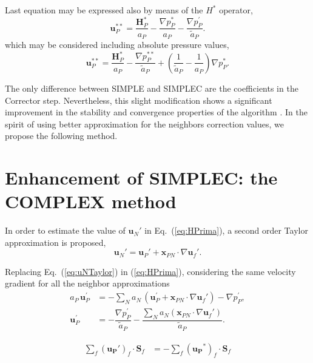 \documentclass[final,3p,times,10pt,onecolumn]{myElsarticle}
\numberwithin{equation}{section}
\begin{document}
Last equation may be expressed also by means of the $H^*$ operator,
\begin{equation}
\boldsymbol{u}^{**}_P 
=
\dfrac
{\boldsymbol{H}_P^* }
{a_P}
- 
\frac{\nabla p_P^{*}}{a_P}
- 
\frac{\nabla p_P^{'}}{\tilde{a}_P}.
\end{equation}
which may be considered including absolute pressure values,
\begin{equation}
\boldsymbol{u}^{**}_P 
=
\dfrac
{\boldsymbol{H}_P^* }
{a_P}
- 
\frac{\nabla p_P^{**}}{\tilde{a}_P}
+
\left(
\dfrac{1}{\tilde{
a}_P}
-
\dfrac{1}{a_P}
\right)
\nabla p_P^{*}.
\label{eq:UCorrSIMPLEC}
\end{equation}


The only difference between SIMPLE and SIMPLEC are the coefficients in the Corrector step. Nevertheless, this slight modification shows a significant improvement in the stability  and convergence properties of the algorithm \cite{liu}. In the spirit of using better approximation for the neighbors correction values, we propose the following method.

\section{Enhancement of SIMPLEC: the COMPLEX method}
\label{sec:COMPLEX}

In order to estimate the value of $\boldsymbol{u}_N'$ in Eq.~(\ref{eq:HPrima}), a second order Taylor approximation is proposed,
\begin{equation}\label{eq:uNTaylor}
\boldsymbol{u}_N' = \boldsymbol{u}_P' + \boldsymbol{x}_{PN}\cdot 
\nabla \boldsymbol{u}_f'.
\end{equation}

Replacing Eq.~(\ref{eq:uNTaylor}) in (\ref{eq:HPrima}), considering the same velocity gradient for all the neighbor approximations
\begin{align}
\label{eq:uPrimeCOMPLEX}
a_P\,\boldsymbol{u}_P^{'} 
&=
 -\sum_{N} a_{N}\, \left(\boldsymbol{u}_P^{'} + \boldsymbol{x}_{PN}\cdot \nabla \boldsymbol{u}_f'\right)- \nabla p_P^{'}, 
\\
\boldsymbol{u}_P^{'} 
&=
- \dfrac{\nabla p_P^{'}}
{\tilde{a}_P}
-
\dfrac
{
\sum_{N} a_{N} 
( 
\boldsymbol{x}_{PN} 
\cdot
\nabla \boldsymbol{u}_f' 
)
}
{\tilde{a}_P}.
\end{align}

\begin{align} 
\label{eq:div-free4Again}
\sum_f \left(\boldsymbol{u_P}'\right)_{f} \cdot \boldsymbol{S}_f &= -\sum_f \left(\boldsymbol{u_P}^{*}\right)_{f} \cdot \boldsymbol{S}_f 
\end{align}
\end{document}
